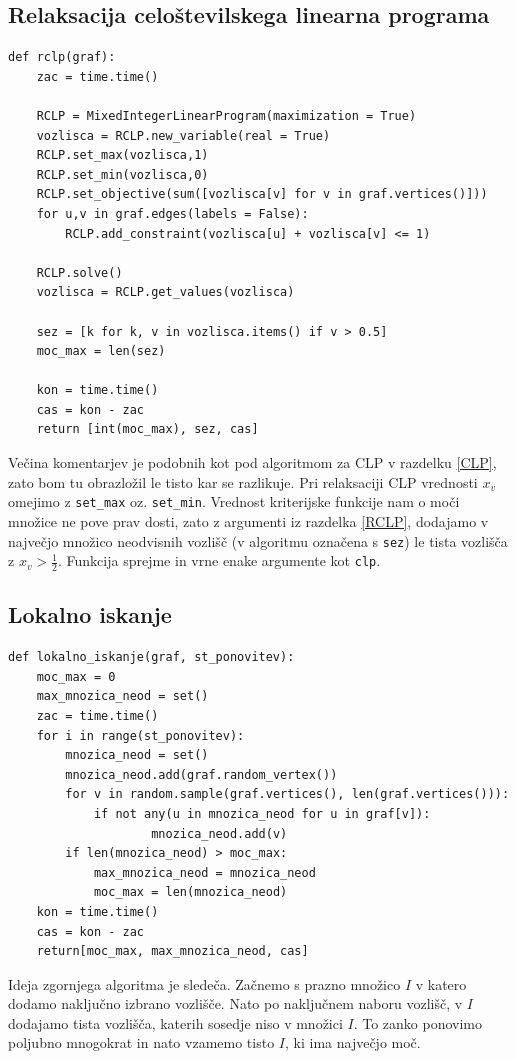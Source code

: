 \documentclass[a4paper, 12 pt]{article}
\theoremstyle{definition}
\theoremstyle{plain}
\theoremstyle{remark}
\begin{document}
\subsection{Relaksacija celoštevilskega linearna programa}
\begin{verbatim}
def rclp(graf):
    zac = time.time()

    RCLP = MixedIntegerLinearProgram(maximization = True)
    vozlisca = RCLP.new_variable(real = True)
    RCLP.set_max(vozlisca,1)
    RCLP.set_min(vozlisca,0)
    RCLP.set_objective(sum([vozlisca[v] for v in graf.vertices()]))
    for u,v in graf.edges(labels = False):
        RCLP.add_constraint(vozlisca[u] + vozlisca[v] <= 1)

    RCLP.solve()
    vozlisca = RCLP.get_values(vozlisca)

    sez = [k for k, v in vozlisca.items() if v > 0.5]
    moc_max = len(sez)

    kon = time.time()
    cas = kon - zac
    return [int(moc_max), sez, cas]
\end{verbatim}
Večina komentarjev je podobnih kot pod algoritmom za CLP v razdelku \ref{CLP}, zato bom tu obrazložil le tisto kar se razlikuje. Pri relaksaciji CLP vrednosti $x_v$ omejimo z \verb|set_max| oz. \verb|set_min|. Vrednost kriterijske funkcije nam o moči množice ne pove prav dosti, zato z argumenti iz razdelka \ref{RCLP}, dodajamo v največjo množico neodvisnih vozlišč (v algoritmu označena s \verb|sez|) le tista vozlišča z $x_v > \frac{1}{2}$. Funkcija sprejme in vrne enake argumente kot \verb|clp|.

\subsection{Lokalno iskanje} \label{lokiskalgorit}
\begin{verbatim}
def lokalno_iskanje(graf, st_ponovitev):
    moc_max = 0 
    max_mnozica_neod = set() 
    zac = time.time()
    for i in range(st_ponovitev):
        mnozica_neod = set() 
        mnozica_neod.add(graf.random_vertex()) 
        for v in random.sample(graf.vertices(), len(graf.vertices())):
            if not any(u in mnozica_neod for u in graf[v]): 
                    mnozica_neod.add(v)
        if len(mnozica_neod) > moc_max: 
            max_mnozica_neod = mnozica_neod
            moc_max = len(mnozica_neod)
    kon = time.time()
    cas = kon - zac
    return[moc_max, max_mnozica_neod, cas]
\end{verbatim}

Ideja zgornjega algoritma je sledeča. Začnemo s prazno množico $I$ v katero dodamo naključno izbrano vozlišče. Nato po naključnem naboru vozlišč, v  $I$ dodajamo tista vozlišča, katerih sosedje niso v množici  $I$. To zanko ponovimo poljubno mnogokrat in nato vzamemo tisto  $I$, ki ima največjo moč.
\end{document}
